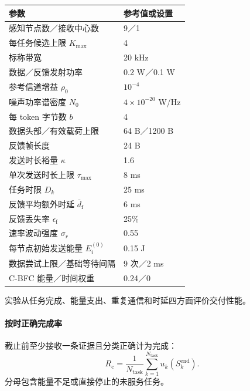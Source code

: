 \begin{table}[t]
  \centering\small
  \label{rq3:tab:parameters}
  \begin{tabularx}{\linewidth}{@{}Yl@{}}
    \toprule
    参数 & 参考值或设置\\
    \midrule
    感知节点数／接收中心数 & 9／1\\
    每任务候选上限 $K_{\max}$ & 4\\
    标称带宽 & 20 kHz\\
    数据／反馈发射功率 & 0.2 W／0.1 W\\
    参考信道增益 $\rho_0$ & $10^{-4}$\\
    噪声功率谱密度 $N_0$ & $4\times10^{-20}$ W/Hz\\
    每 token 字节数 $b$ & 4\\
    数据头部／有效载荷上限 & 64 B／1200 B\\
    反馈帧长度 & 24 B\\
    发送时长裕量 $\kappa$ & 1.6\\
    单次发送时长上限 $\tau_{\max}$ & 8 ms\\
    任务时限 $D_k$ & 25 ms\\
    反馈平均额外时延 $\bar d_{\mathrm f}$ & 6 ms\\
    反馈丢失率 $\epsilon_{\mathrm f}$ & 25\%\\
    速率波动强度 $\sigma_r$ & 0.55\\
    每节点初始发送能量 $E_i^{(0)}$ & 0.15 J\\
    数据尝试上限／基础等待间隔 & 9 次／2 ms\\
    C-BFC 能量／时间权重 & 0.24／0\\
    \bottomrule
  \end{tabularx}
\end{table}

实验从任务完成、能量支出、重复通信和时延四方面评价交付性能。

\paragraph{按时正确完成率}
截止前至少接收一条证据且分类正确计为完成：
\begin{equation}
  R_{\mathrm c}=\frac{1}{N_{\mathrm{task}}}\sum_{k=1}^{N_{\mathrm{task}}} u_k(S_k^{\mathrm{end}}).
  \label{rq3:eq:metric-correct}
\end{equation}
分母包含能量不足或直接停止的未服务任务。

